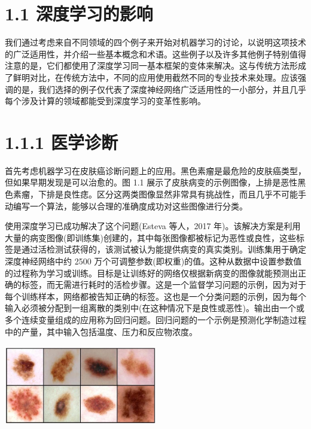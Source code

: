 \documentclass[10pt]{article}
\begin{document}
\section*{1.1 深度学习的影响}

我们通过考虑来自不同领域的四个例子来开始对机器学习的讨论，以说明这项技术的广泛适用性，并介绍一些基本概念和术语。这些例子以及许多其他例子特别值得注意的是，它们都使用了深度学习同一基本框架的变体来解决。这与传统方法形成了鲜明对比，在传统方法中，不同的应用使用截然不同的专业技术来处理。应该强调的是，我们选择的例子仅代表了深度神经网络广泛适用性的一小部分，并且几乎每个涉及计算的领域都能受到深度学习的变革性影响。

\section*{1.1.1 医学诊断}

首先考虑机器学习在皮肤癌诊断问题上的应用。黑色素瘤是最危险的皮肤癌类型，但如果早期发现是可以治愈的。图 1.1 展示了皮肤病变的示例图像，上排是恶性黑色素瘤，下排是良性痣。区分这两类图像显然非常具有挑战性，而且几乎不可能手动编写一个算法，能够以合理的准确度成功对这些图像进行分类。

使用深度学习已成功解决了这个问题(Esteva 等人，2017 年)。该解决方案是利用大量的病变图像(即训练集)创建的，其中每张图像都被标记为恶性或良性，这些标签是通过活检测试获得的，该测试被认为能提供病变的真实类别。训练集用于确定深度神经网络中约 2500 万个可调整参数(即权重)的值。这种从数据中设置参数值的过程称为学习或训练。目标是让训练好的网络仅根据新病变的图像就能预测出正确的标签，而无需进行耗时的活检步骤。这是一个监督学习问题的示例，因为对于每个训练样本，网络都被告知正确的标签。这也是一个分类问题的示例，因为每个输入必须被分配到一组离散的类别中(在这种情况下是良性或恶性)。输出由一个或多个连续变量组成的应用称为回归问题。回归问题的一个示例是预测化学制造过程中的产量，其中输入包括温度、压力和反应物浓度。

\begin{center}
\includegraphics[max width=0.5\textwidth]{images/0194e279-9b28-703a-88f4-c3ac21e2010d_21_871_1649_671_348_0.jpg}
\end{center}
\hspace*{3em} 
\end{document}
